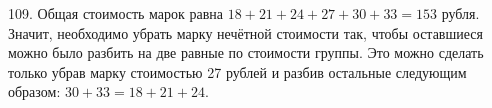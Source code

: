 109. Общая стоимость марок равна $18+21+24+27+30+33=153$ рубля. Значит, необходимо убрать марку нечётной стоимости так, чтобы оставшиеся можно было разбить на две равные по стоимости группы. Это можно сделать только убрав марку стоимостью 27 рублей и разбив остальные следующим образом: $30+33=18+21+24.$\\
